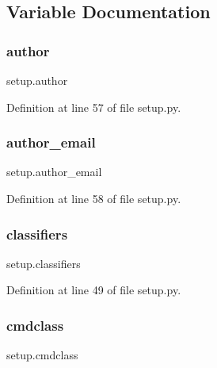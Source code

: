 \subsection{Variable Documentation}
\hypertarget{namespacesetup_a3a57a4772d418a06835249cbade0d86a}{}\label{namespacesetup_a3a57a4772d418a06835249cbade0d86a} 
\subsubsection{\texorpdfstring{author}{author}}
{\footnotesize\ttfamily setup.\+author}



Definition at line 57 of file setup.\+py.

\hypertarget{namespacesetup_a5b08034343aa2be607722a8b315f3625}{}\label{namespacesetup_a5b08034343aa2be607722a8b315f3625} 
\subsubsection{\texorpdfstring{author\+\_\+email}{author\_email}}
{\footnotesize\ttfamily setup.\+author\+\_\+email}



Definition at line 58 of file setup.\+py.

\hypertarget{namespacesetup_abe96a9c38c1c61f9f0fdb002c482f785}{}\label{namespacesetup_abe96a9c38c1c61f9f0fdb002c482f785} 
\subsubsection{\texorpdfstring{classifiers}{classifiers}}
{\footnotesize\ttfamily setup.\+classifiers}



Definition at line 49 of file setup.\+py.

\hypertarget{namespacesetup_aa128e9ba397a7b5b03bb964c4d14268d}{}\label{namespacesetup_aa128e9ba397a7b5b03bb964c4d14268d} 
\subsubsection{\texorpdfstring{cmdclass}{cmdclass}}
{\footnotesize\ttfamily setup.\+cmdclass}



